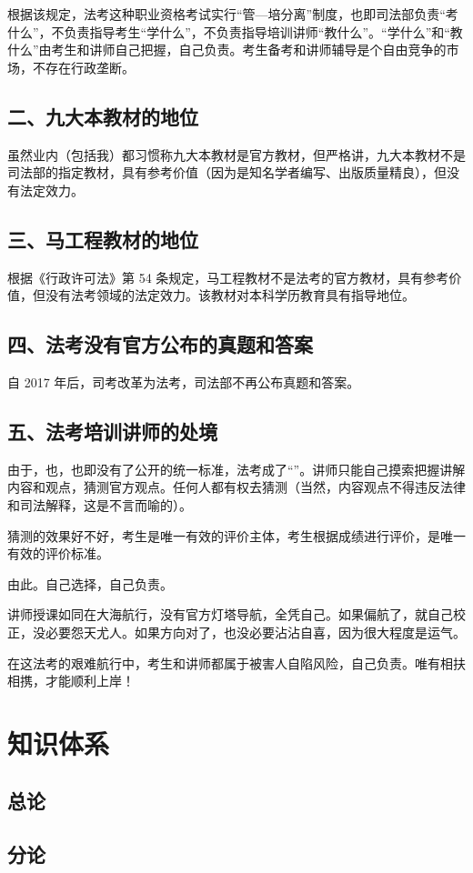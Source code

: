 根据该规定，法考这种职业资格考试实行“管—培分离”制度，也即司法部负责“考什么”，不负责指导考生“学什么”，不负责指导培训讲师“教什么”。“学什么”和“教什么”由考生和讲师自己把握，自己负责。考生备考和讲师辅导是个自由竞争的市场，不存在行政垄断。

\section*{二、九大本教材的地位}
虽然业内（包括我）都习惯称九大本教材是官方教材，但严格讲，九大本教材不是司法部的指定教材，具有参考价值（因为是知名学者编写、出版质量精良），但没有法定效力。

\section*{三、马工程教材的地位}
根据《行政许可法》第 54 条规定，马工程教材不是法考的官方教材，具有参考价值，但没有法考领域的法定效力。该教材对本科学历教育具有指导地位。

\section*{四、法考没有官方公布的真题和答案}
自 2017 年后，司考改革为法考，司法部不再公布真题和答案。

\section*{五、法考培训讲师的处境}
由于，也，也即没有了公开的统一标准，法考成了“”。讲师只能自己摸索把握讲解内容和观点，猜测官方观点。任何人都有权去猜测（当然，内容观点不得违反法律和司法解释，这是不言而喻的）。

猜测的效果好不好，考生是唯一有效的评价主体，考生根据成绩进行评价，是唯一有效的评价标准。

由此。自己选择，自己负责。

讲师授课如同在大海航行，没有官方灯塔导航，全凭自己。如果偏航了，就自己校正，没必要怨天尤人。如果方向对了，也没必要沾沾自喜，因为很大程度是运气。

在这法考的艰难航行中，考生和讲师都属于被害人自陷风险，自己负责。唯有相扶相携，才能顺利上岸！

\chapter*{知识体系}
\section*{总论}
\section*{分论}
